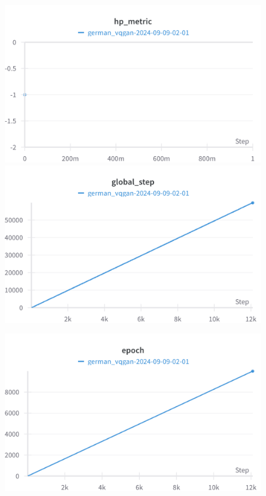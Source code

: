 \begin{figure}[!htb]
\includegraphics[width=\linewidth]{charts/Section-8-Panel-0-dn8bpp6rt}
\caption{}
\endminipage\hfill
{}
\includegraphics[width=\linewidth]{charts/Section-8-Panel-1-z2xepgyu7}
\caption{}
\endminipage
\end{figure}

\begin{figure}[!htb]
\includegraphics[width=\linewidth]{charts/Section-8-Panel-2-4t8ldmpb8}
\caption{}
\endminipage
\end{figure}
